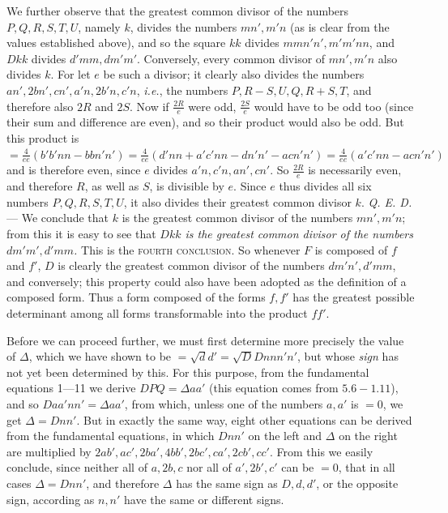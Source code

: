 We further observe that the greatest common divisor of the numbers $P,\allowbreak Q,\allowbreak R,\allowbreak S,\allowbreak T,\allowbreak U$, namely $k$, divides the numbers $mn',m'n$ (as is clear from the values established above), and so the square $kk$ divides $mmn'n',m'm'nn$, and $Dkk$ divides $d'mm,dm'm'$. Conversely, every common divisor of $mn',m'n$ also divides $k$. For let $e$ be such a divisor; it clearly also divides the numbers $an',2bn',cn',a'n,2b'n,c'n$, \textit{i.e.}, the numbers $P,R-S,U,Q,R+S,T$, and therefore also $2R$ and $2S$. Now if $\frac{2R}{e}$ were odd, $\frac{2S}{e}$ would have to be odd too (since their sum and difference are even), and so their product would also be odd. But this product is $=\frac{4}{ee}(b'b'nn-bbn'n')=\frac{4}{ee}(d'nn+a'c'nn-dn'n'-acn'n')=\frac{4}{ee}(a'c'nn-acn'n')$ and is therefore even, since $e$ divides $a'n,c'n,an',cn'$. So $\frac{2R}{e}$ is necessarily even, and therefore $R$, as well as $S$, is divisible by $e$. Since $e$ thus divides all six numbers $P,Q,R,S,T,U$, it also divides their greatest common divisor $k$. \textit{Q. E. D.} --- We conclude that $k$ is the greatest common divisor of the numbers $mn',m'n$; from this it is easy to see that \textit{$Dkk$ is the greatest common divisor of the numbers $dm'm',d'mm$.} This is the \textsc{fourth conclusion}. So whenever $F$ is composed of $f$ and $f'$, $D$ is clearly the greatest common divisor of the numbers $dm'n',d'mm$, and conversely; this property could also have been adopted as the definition of a composed form. Thus a form composed of the
forms $f,f'$ has the greatest possible determinant among all forms transformable into the product $ff'$.

Before we can proceed further, we must first determine more precisely the value of $\Delta$, which we have shown to be $=\surd dd'=\surd DDnnn'n'$, but whose \textit{sign} has not yet been determined by this. For this purpose, from the fundamental equations 1---11 we derive $DPQ=\Delta aa'$ (this equation comes from $5.6-1.11$), and so $Daa'nn'=\Delta aa'$, from which, unless one of the numbers $a,a'$ is $=0$, we get $\Delta=Dnn'$. But in exactly the same way, eight other equations can be derived from the fundamental equations, in which $Dnn'$ on the left and $\Delta$ on the right are multiplied by $2ab',ac',2ba',4bb',2bc',ca',2cb',cc'$. From this we easily conclude, since neither all of $a,2b,c$ nor all of $a',2b',c'$ can be $=0$, that in all cases $\Delta=Dnn'$, and therefore $\Delta$ has the same sign as $D,d,d'$, or the opposite sign, according as $n,n'$ have the same or different signs.

